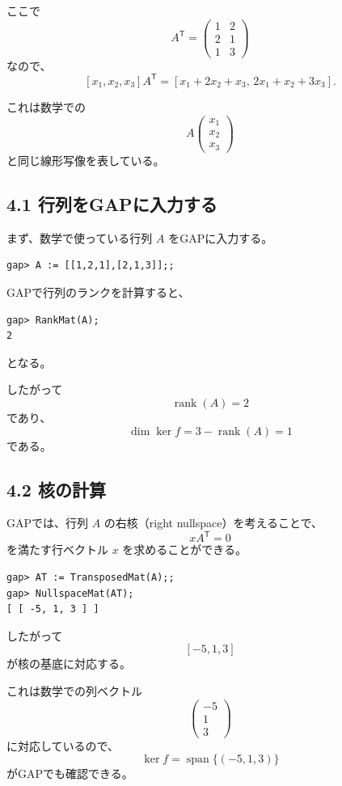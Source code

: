 \documentclass[a4paper,11pt]{ltjsarticle}
\begin{document}
ここで
\[
A^{\mathsf T}
=
\begin{pmatrix}
1&2\\
2&1\\
1&3
\end{pmatrix}
\]
なので、
\[
[x_1,x_2,x_3]A^{\mathsf T}
=
[x_1+2x_2+x_3,\,
  2x_1+x_2+3x_3].
\]

これは数学での
\[
A
\begin{pmatrix}
x_1\\x_2\\x_3
\end{pmatrix}
\]
と同じ線形写像を表している。

\subsection*{4.1 行列をGAPに入力する}

まず、数学で使っている行列 $A$ をGAPに入力する。

\begin{lstlisting}
gap> A := [[1,2,1],[2,1,3]];;
\end{lstlisting}

GAPで行列のランクを計算すると、

\begin{lstlisting}
gap> RankMat(A);
2
\end{lstlisting}

となる。

したがって
\[
\operatorname{rank}(A)=2
\]
であり、
\[
\dim\ker f
=3-\operatorname{rank}(A)
=1
\]
である。

\subsection*{4.2 核の計算}

GAPでは、行列 $A$ の右核（right nullspace）を考えることで、
\[
xA^{\mathsf T}=0
\]
を満たす行ベクトル $x$ を求めることができる。

\begin{lstlisting}
gap> AT := TransposedMat(A);;
gap> NullspaceMat(AT);
[ [ -5, 1, 3 ] ]
\end{lstlisting}

したがって
\[
[-5,1,3]
\]
が核の基底に対応する。

これは数学での列ベクトル
\[
\begin{pmatrix}
-5\\1\\3
\end{pmatrix}
\]
に対応しているので、
\[
\boxed{\ker f
=\operatorname{span}\{(-5,1,3)\}}
\]
がGAPでも確認できる。
\end{document}
